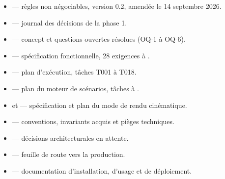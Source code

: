 \begin{itemize}[leftmargin=1.4em]
  \item {} — règles non négociables, version 0.2,
        amendée le 14 septembre 2026.
  \item {} — journal des décisions
        de la phase 1.
  \item {} — concept et questions ouvertes
        résolues (OQ-1 à OQ-6).
  \item {} — spécification fonctionnelle,
        28 exigences  à .
  \item {} — plan d'exécution, tâches T001 à T018.
  \item {} — plan du moteur de scénarios,
        tâches  à .
  \item {} et  —
        spécification et plan du mode de rendu cinématique.
  \item {} — conventions, invariants acquis et pièges
        techniques.
  \item {} — décisions architecturales en attente.
  \item {} — feuille de route vers la production.
  \item {} — documentation d'installation, d'usage et de
        déploiement.
\end{itemize}
